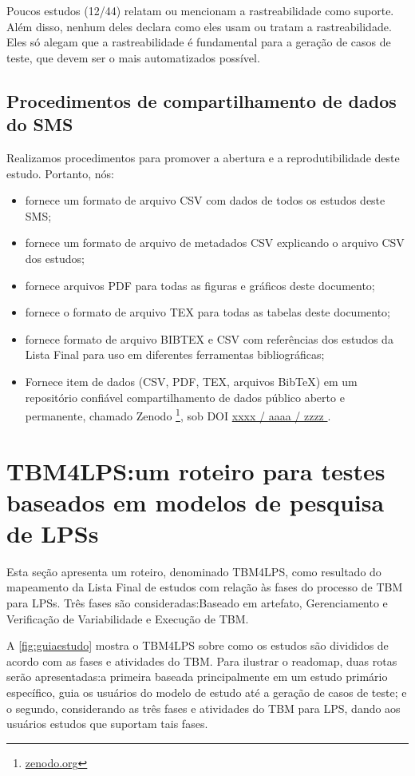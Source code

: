 Poucos estudos (12/44) relatam ou mencionam a rastreabilidade como suporte. Além disso, nenhum deles declara como eles usam ou tratam a rastreabilidade. Eles só alegam que a rastreabilidade é fundamental para a geração de casos de teste, que devem ser o mais automatizados possível.


\subsection{Procedimentos de compartilhamento de dados do SMS}

Realizamos procedimentos para promover a abertura e a reprodutibilidade deste estudo. Portanto, nós:

\begin{itemize}
	\item fornece um formato de arquivo CSV com dados de todos os estudos deste SMS;
	\item fornece um formato de arquivo de metadados CSV explicando o arquivo CSV dos estudos;
	\item fornece arquivos PDF para todas as figuras e gráficos deste documento;
	\item fornece o formato de arquivo TEX para todas as tabelas deste documento;
	\item fornece formato de arquivo BIBTEX e CSV com referências dos estudos da Lista Final para uso em diferentes ferramentas bibliográficas;
	\item Fornece item de dados (CSV, PDF, TEX, arquivos BibTeX) em um repositório confiável compartilhamento de dados público aberto e permanente, chamado Zenodo \footnote{\url{zenodo.org}}, sob DOI \url{xxxx / aaaa / zzzz }.
\end{itemize}

\section{TBM4LPS:um roteiro para testes baseados em modelos de pesquisa de LPSs}
\label{sec:roadmap}

Esta seção apresenta um roteiro, denominado TBM4LPS, como resultado do mapeamento da Lista Final de estudos com relação às fases do processo de TBM para LPSs. Três fases são consideradas:Baseado em artefato, Gerenciamento e Verificação de Variabilidade e Execução de TBM.

A  \ref{fig:guiaestudo} mostra o TBM4LPS sobre como os estudos são divididos de acordo com as fases e atividades do TBM. Para ilustrar o readomap, duas rotas serão apresentadas:a primeira baseada principalmente em um estudo primário específico, guia os usuários do modelo de estudo até a geração de casos de teste; e o segundo, considerando as três fases e atividades do TBM para LPS, dando aos usuários estudos que suportam tais fases.

